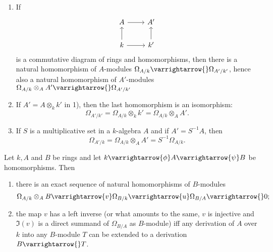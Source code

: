 \documentclass[../main]{subfiles}
\begin{document}
\begin{exercise}
\begin{enumerate}[label = \arabic*)]
    \item\label{exe:26.01} If \[\begin{tikzcd}A \arrow[r] &A' \\ k \arrow[u] \arrow[r] &k'\arrow[u] \end{tikzcd}\] is a commutative diagram of rings and homomorphisms, then there is a natural homomorphism of $A$-modules $\Omega_{A / k} \varrightarrow{} \Omega_{A' / k'}$, hence also a natural homomorphism of $A'$-modules $\Omega_{A / k} \otimes_AA' \varrightarrow{} \Omega_{A' / k'}$

    \item\label{exe:26.02} If $A'=A\otimes_k k'$ in 1), then the last homomorphism is an isomorphism: \[\Omega_{A' / k'}=\Omega_{A / k} \otimes_k k'=\Omega_{A / k} \otimes_A A'.\]

    \item\label{exe:26.03} If $S$ is a multiplicative set in a $k$-algebra $A$ and if $A'=S^{-1} A$, then \[\Omega_{A' / k}=\Omega_{A / k} \otimes_A A'=S^{-1} \Omega_{A / k}.\]
\end{enumerate}
\end{exercise}

\begin{partheorem}\label{thm:057}
Let $k, A$ and $B$ be rings and let $k \varrightarrow{\phi} A \varrightarrow{\psi} B$ be homomorphisms. Then
\begin{enumerate}
    \item there is an exact sequence of natural homomorphisms of $B$-modules \[\Omega_{A / k} \otimes_A B\varrightarrow{v} \Omega_{B / k} \varrightarrow{u} \Omega_{B / A} \varrightarrow{} 0 ;\]
    
    \item the map $v$ has a left inverse (or what amounts to the same, $v$ is injective and $\Im(v)$ is a direct summand of $\Omega_{B / A}$ as $B$-module) iff any derivation of $A$ over $k$ into any $B$-module $T$ can be extended to a derivation $B \varrightarrow{} T$.
\end{enumerate}
\end{partheorem}
\end{document}

